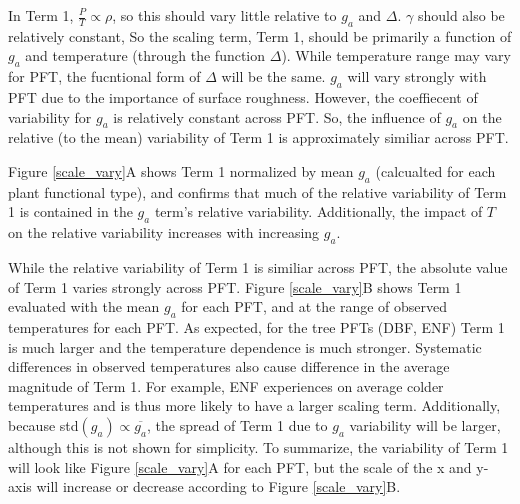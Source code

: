 \documentclass[draft,linenumbers]{agujournal}
\begin{document}
In Term 1, $\frac{P}{T} \propto \rho$, so this should vary little relative to $g_a$ and $\Delta$.  $\gamma$ should also be relatively constant, So the scaling term, Term 1, should be primarily a function of $g_a$ and temperature (through the function $\Delta$). While temperature range may vary for PFT, the fucntional form of $\Delta$ will be the same. $g_a$ will vary strongly with PFT due to the importance of surface roughness. However, the coeffiecent of variability for $g_a$ is relatively constant across PFT. So, the influence of $g_a$ on the relative (to the mean) variability of Term 1 is approximately similiar across PFT.

Figure \ref{scale_vary}A shows Term 1 normalized by mean $g_a$ (calcualted for each plant functional type), and confirms that much of the relative variability of Term 1 is contained in the $g_a$ term's relative variability. Additionally, the impact of $T$ on the relative variability increases with increasing $g_a$. %

While the relative variability of Term 1 is similiar across PFT, the absolute value of Term 1 varies strongly across PFT. Figure \ref{scale_vary}B shows Term 1 evaluated with the mean $g_a$ for each PFT, and at the range of observed temperatures for each PFT. As expected, for the tree PFTs (DBF, ENF) Term 1 is much larger and the temperature dependence is much stronger. Systematic differences in observed temperatures also cause difference in the average magnitude of Term 1. For example, ENF experiences on average colder temperatures and is thus more likely to have a larger scaling term. Additionally, because std$(g_a) \propto \overline{g_a}$, the spread of Term 1 due to $g_a$ variability will be larger, although this is not shown for simplicity. To summarize, the variability of Term 1 will look like Figure \ref{scale_vary}A for each PFT, but the scale of the x and y-axis will increase or decrease according to Figure \ref{scale_vary}B.
 
\end{document}
